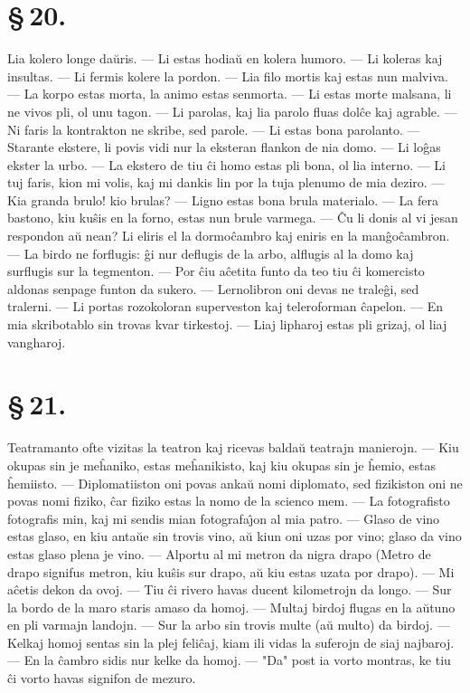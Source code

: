 \section*{\S\,20.}
Lia kolero longe da\u uris. --- Li estas hodia\u u en kolera humoro.
--- Li koleras kaj insultas. --- Li fermis kolere la pordon. --- Lia
filo mortis kaj estas nun malviva. --- La korpo estas morta, la
animo estas senmorta. --- Li estas morte malsana, li ne vivos pli,
ol unu tagon. --- Li parolas, kaj lia parolo fluas dol\^ce kaj
agrable. --- Ni faris la kontrakton ne skribe, sed parole. --- Li
estas bona parolanto. --- Starante ekstere, li povis vidi nur la
eksteran flankon de nia domo. --- Li lo\^gas ekster la urbo. --- La
ekstero de tiu \^ci homo estas pli bona, ol lia interno. --- Li tuj
faris, kion mi volis, kaj mi dankis lin por la tuja plenumo de mia
deziro. --- Kia granda brulo! kio brulas? --- Ligno estas bona brula
materialo. --- La fera bastono, kiu ku\^sis en la forno, estas nun
brule varmega. --- \^Cu li donis al vi jesan respondon a\u u nean?
Li eliris el la dormo\^cambro kaj eniris en la man\^go\^cambron.
--- La birdo ne forflugis: \^gi nur deflugis de la arbo, alflugis al
la domo kaj surflugis sur la tegmenton. --- Por \^ciu a\^cetita
funto da teo tiu \^ci komercisto aldonas senpage funton da sukero.
--- Lernolibron oni devas ne trale\^gi, sed tralerni. --- Li portas
rozokoloran superveston kaj teleroforman \^capelon. --- En mia
skribotablo sin trovas kvar tirkestoj. --- Liaj lipharoj estas pli
grizaj, ol liaj vangharoj.


\section*{\S\,21.}
Teatramanto ofte vizitas la teatron kaj ricevas balda\u u teatrajn
manierojn. --- Kiu okupas sin je me\^haniko, estas me\^hanikisto,
kaj kiu okupas sin je \^hemio, estas \^hemiisto. --- Diplomatiiston
oni povas anka\u u nomi diplomato, sed fizikiston oni ne povas nomi
fiziko, \^car fiziko estas la nomo de la scienco mem. --- La
fotografisto fotografis min, kaj mi sendis mian fotografa\^{\j}on al
mia patro. --- Glaso de vino estas glaso, en kiu anta\u ue sin
trovis vino, a\u u kiun oni uzas por vino; glaso da vino estas glaso
plena je vino. --- Alportu al mi metron da nigra drapo (Metro de
drapo signifus metron, kiu ku\^sis sur drapo, a\u u kiu estas uzata
por drapo). --- Mi a\^cetis dekon da ovoj. --- Tiu \^ci rivero havas
ducent kilometrojn da longo. --- Sur la bordo de la maro staris
amaso da homoj. --- Multaj birdoj flugas en la a\u utuno en pli
varmajn landojn. --- Sur la arbo sin trovis multe (a\u u multo) da
birdoj. --- Kelkaj homoj sentas sin la plej feli\^caj, kiam ili
vidas la suferojn de siaj najbaroj. --- En la \^cambro sidis nur
kelke da homoj. --- "Da" post ia vorto montras, ke tiu \^ci vorto
havas signifon de mezuro.

